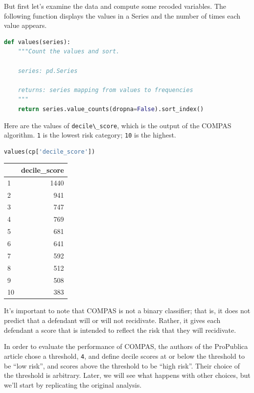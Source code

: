 But first let's examine the data and compute some recoded variables. The
following function displays the values in a Series and the number of
times each value appears.

\begin{lstlisting}[language=Python]
def values(series):
    """Count the values and sort.
    
    series: pd.Series
    
    returns: series mapping from values to frequencies
    """
    return series.value_counts(dropna=False).sort_index()
\end{lstlisting}

Here are the values of \passthrough{\lstinline!decile\_score!}, which is
the output of the COMPAS algorithm. \passthrough{\lstinline!1!} is the
lowest risk category; \passthrough{\lstinline!10!} is the highest.

\begin{lstlisting}[language=Python]
values(cp['decile_score'])
\end{lstlisting}

\begin{tabular}{lr}
\toprule
{} &  decile\_score \\
\midrule
1  &          1440 \\
2  &           941 \\
3  &           747 \\
4  &           769 \\
5  &           681 \\
6  &           641 \\
7  &           592 \\
8  &           512 \\
9  &           508 \\
10 &           383 \\
\bottomrule
\end{tabular}

It's important to note that COMPAS is not a binary classifier; that is,
it does not predict that a defendant will or will not recidivate.
Rather, it gives each defendant a score that is intended to reflect the
risk that they will recidivate.

In order to evaluate the performance of COMPAS, the authors of the
ProPublica article chose a threshold, \passthrough{\lstinline!4!}, and
define decile scores at or below the threshold to be ``low risk'', and
scores above the threshold to be ``high risk''. Their choice of the
threshold is arbitrary. Later, we will see what happens with other
choices, but we'll start by replicating the original analysis.

